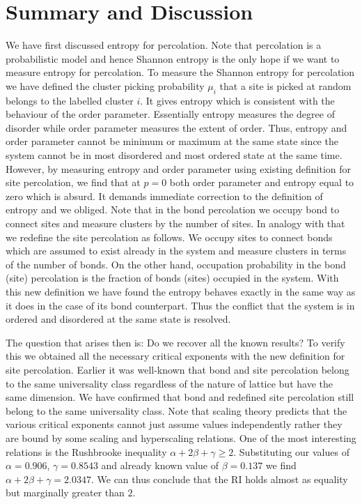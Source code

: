 
\chapter{Summary and Discussion}
\label{chapter.summary}


We have first discussed entropy for percolation. Note that percolation
is a probabilistic model and hence Shannon entropy is the only hope if we want to measure entropy 
for percolation. To measure the Shannon entropy for percolation we 
have defined the cluster picking probability $\mu_i$ that a site is picked at random belongs to
the labelled cluster $i$. It gives entropy which is consistent with the behaviour 
of the order parameter. Essentially entropy measures 
the degree of disorder while order parameter measures the extent of order. Thus, entropy and order parameter cannot be minimum or maximum 
at the same state since the system cannot be in most disordered and most ordered state at the same time.
However, by measuring entropy and order parameter using existing definition for site percolation, we find
that at $p=0$ both order parameter and entropy equal 
to zero which is absurd. It demands immediate correction to the definition of entropy and we obliged. 
Note that in the bond percolation we occupy bond to connect sites and measure clusters by the
number of sites. In analogy with that we redefine the site percolation as follows. We occupy sites to connect 
bonds which are assumed to exist already in the system and measure clusters in terms of the number of bonds. On the other hand, occupation probability in the bond (site) percolation is the fraction of bonds (sites) occupied
in the system. With this new definition we have found the entropy behaves exactly in the same way as 
it does in the case of its bond counterpart. Thus the conflict that the system is in ordered and disordered 
at the same state is resolved. 


The question that arises then is: Do we recover all the known results? To verify
this we obtained all the necessary critical exponents with the new definition for 
site percolation. Earlier it was well-known that bond and site percolation belong to the
same universality class regardless of the nature of lattice but have the same dimension.
We have confirmed that bond and redefined site percolation still belong to the same universality class. 
Note that scaling theory predicts that the various critical exponents cannot just assume values 
independently  rather they are bound by some scaling and hyperscaling relations. One
of the most interesting relations is the Rushbrooke inequality $\alpha+2\beta+\gamma\geq 2$.
Substituting our values of $\alpha=0.906$, $\gamma=0.8543$ and already
known value of $\beta=0.137$ we find $\alpha+2\beta+\gamma=2.0347$. 
We can thus conclude that the RI holds almost as equality but marginally greater
than $2$. 



